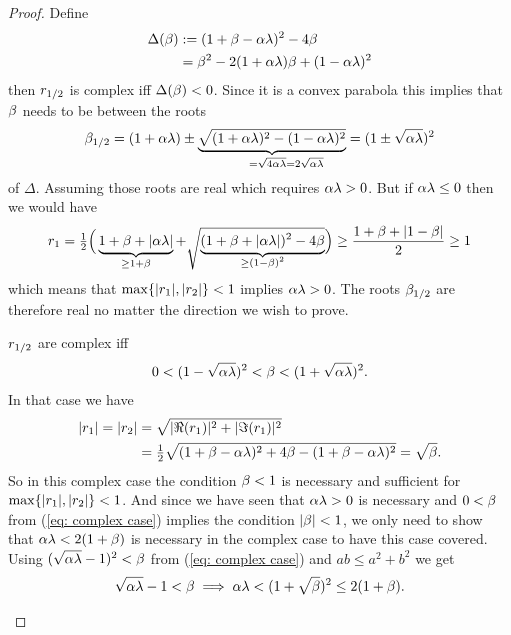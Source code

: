 \begin{proof}
	Define
	\begin{align*}
		\Delta(\beta)
		&:= (1+\beta-\alpha\lambda)^2 - 4\beta\\
		&= \beta^2 - 2(1+\alpha\lambda)\beta + (1-\alpha\lambda)^2
	\end{align*}
	then \(r_{1/2}\) is complex iff \(\Delta(\beta)<0\). Since it is a
	convex parabola this implies that \(\beta\) needs to be between the roots
	\begin{align*}
		\momCoeff_{1/2}
		= (1+\lrSq\hesseEV) \pm 
		\underbrace{
			\sqrt{(1+\lrSq\hesseEV)^2 - (1-\lrSq\hesseEV)^2}
		}_{=\sqrt{4\lrSq\hesseEV}=\mathrlap{2\sqrt{\lrSq\hesseEV}}}
		= (1\pm \sqrt{\lrSq\hesseEV})^2	
	\end{align*}
	of \(\Delta\). Assuming those roots are real which requires \(\alpha\lambda>0\).
	But if \(\alpha\lambda\le0\) then we would have
	\begin{align*}
		r_1
		= \tfrac12 \Big(
			\underbrace{1+\beta+|\alpha\lambda|}_{\ge 1+\beta}
			+ \sqrt{\underbrace{(1+\beta+|\alpha\lambda|)^2 - 4\beta}_{\smash{\ge (1-\beta)^2}}}
		\Big)
		\ge \frac{1+\beta + |1-\beta|}2 \ge 1
	\end{align*}
	which means that \(\max\{|r_1|,|r_2|\}<1\) implies \(\alpha\lambda>0\).
	The roots \(\beta_{1/2}\) are therefore real no matter the direction we
	wish to prove.
	\begin{description}[wide, labelindent=0pt]
	\item[Complex Case:]
		\(r_{1/2}\) are complex iff	
		\begin{align}\label{eq: complex case}
			0 < (1-\sqrt{\alpha\lambda})^2 < \beta < (1+\sqrt{\alpha\lambda})^2.
		\end{align}
		In that case we have
		\begin{align*}
			|r_1| = |r_2|
			&= \sqrt{|\Re(r_1)|^2 + |\Im(r_1)|^2}\\
			&= \tfrac12 \sqrt{(1+\beta-\alpha\lambda)^2 + 4\beta - (1+\beta-\alpha\lambda)^2}
			= \sqrt{\beta}.
		\end{align*}
		So in this complex case the condition
		\(\beta<1\) is necessary and sufficient for \(\max\{|r_1|,|r_2|\}<1\).
		And since we have seen that \(\alpha\lambda>0\) is necessary and \(0<\beta\)
		from (\ref{eq: complex case}) implies the condition \(|\beta|<1\), we only
		need to show that \(\alpha\lambda <2(1+\beta)\) is necessary in the complex
		case to have this case covered. Using \((\sqrt{\alpha\lambda}-1)^2 < \beta\)
		from (\ref{eq: complex case}) and \(ab \le a^2 + b^2\) we get
		\begin{align*}
			\sqrt{\alpha\lambda} - 1
			< \beta \implies \alpha\lambda < (1+\sqrt{\beta})^2
			\le 2(1+\beta).
		\end{align*}


\end{description}
\end{proof}
